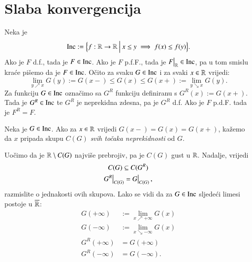 
\chapter{Slaba konvergencija}

Neka je
\begin{equation*}
    \mathrm{Inc} := \Big\{ {f: \mathbb{R} \to \mathbb{R}} \: \Big| \: {x \leq y \implies f (x) \leq f(y)} \Big\}.
\end{equation*}
Ako je $F$ d.f., tada je $F \in \mathrm{Inc}$.
Ako je $F$ p.f.F., tada je $\restr{F}{\real} \in \inc$, pa u tom smislu kra\' ce pi\v semo da je $F \in \mathrm{Inc}$.
O\v cito za svaku $G \in \mathrm{Inc}$ i za svaki $x \in \mathbb{R}$ vrijedi:
\begin{equation}    \label{jed:16.1}
    \lim\limits_{y \nearrow x} G(y) := G(x -) \leq G (x) \leq G(x +) := \lim\limits_{y \searrow x} G(y).
\end{equation}
Za funkciju $G \in \mathrm{Inc}$ ozna\v cimo sa $G^R$ funkciju definiranu s $G^R (x) := G(x+)$.
Tada je $G^R \in \mathrm{Inc}$ te $G^R$ je neprekidna zdesna, pa je $G^R$ d.f.
Ako je $F$ p.d.F. tada je $F^R = F$.

\begin{defn}  \label{defn:16.1-1}
    Neka je $G \in \mathrm{Inc}$.
    Ako za $x \in \mathbb{R}$ vrijedi $G(x-) = G(x) = G(x+)$, ka\v zemo da $x$ pripada skupu $C(G)$ \emph{svih to\v caka neprekidnosti} od $G$.     
\end{defn}

Uo\v cimo da je $\mathbb{R} \setminus C(G)$ najvi\v se prebrojiv, pa je $C(G)$ gust u $\mathbb{R}$.
Nadalje, vrijedi
\begin{equation}    \label{jed:16.2}
    \begin{gathered}
        C(G) \subseteq C(G^R)\\
        \restr{G^R}{C(G)} = \restr{G}{C(G)},
    \end{gathered}
\end{equation}
razmislite o jednakosti ovih skupova.
Lako se vidi da za $G \in \mathrm{Inc}$ sljede\' ci limesi postoje u $\overline{\mathbb{R}}$:
\begin{equation}    \label{jed:16.3}
    \begin{aligned}
        G(+\infty) &:= \lim\limits_{x \nearrow +\infty} G(x)\\
        G(-\infty) &:= \lim\limits_{x \searrow -\infty} G(x)\\
        G^R(+\infty) &= G(+\infty)\\
        G^R(-\infty) &= G(-\infty).
    \end{aligned}
\end{equation}

